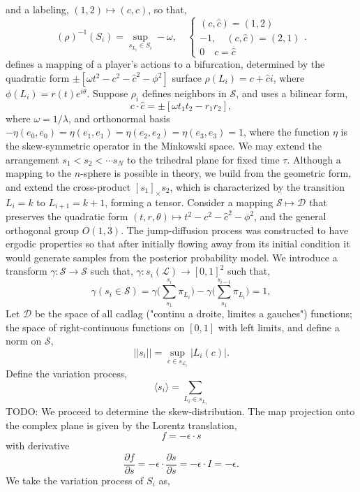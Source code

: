 \documentclass[10pt]{article}
\newcommand{\mcL}{\mathcal{L}}
\newcommand{\mcS}{\mathcal{S}}
\newcommand{\mcD}{\mathcal{D}}
\theoremstyle{definition}
\begin{document}
and a labeling, $(1,2)\mapsto (c,\hat c)$, so that,
$$
    (\rho)^{-1}(S_i) = \sup_{s_{L_i} \in S_i} -\omega, \quad \begin{cases}
    (c,\hat c)
    = (1,2)\\ -1, \quad (c,\hat c) = (2,1) \\ 0 \quad c=\hat c\end{cases}.
$$
defines a mapping of a player's actions to a bifurcation, determined by the 
quadratic form $\pm [\omega t^2 - c^2 -\hat c^2 - \phi^2]$ 
surface $\rho(L_i) = c + \hat ci$, where $\phi(L_i) = r(t)e^{i\theta}$.
Suppose $\rho_i$ defines neighbors in $\mcS$, and uses a bilinear form,
$$  
   c\cdot \hat c = \pm [\omega t_1t_2 - r_1r_2],
$$
where $\omega = 1/\lambda$, and orthonormal basis $-\eta(e_0,e_0) = \eta(e_1,e_1) = \eta(e_2,e_2) =
\eta(e_3,e_3) = 1$, where the function $\eta$ is the skew-symmetric operator in
the Minkowski space.
We may extend the arrangement $s_1<s_2<\cdots s_N$ to the trihedral plane for
fixed time $\tau$. Although a mapping to the $n$-sphere is possible in theory,
we build from the geometric form, and extend the cross-product $[s_1]_\times
s_2$, which is characterized by the transition $L_i=k$ to $L_{i+1}=k+1$, forming
a tensor.
Consider a mapping $\mcS\mapsto \mcD$ that preserves the quadratic form $(t, r,
\theta)\mapsto t^2-c^2-\hat c^2-\phi^2$, and the general orthogonal group $O(1,3)$.
The jump-diffusion process was constructed to have ergodic properties so that after initially flowing away from its initial condition it would generate samples from the posterior probability model.
We introduce a transform $\gamma: \mcS \rightarrow \mcS$ such that,
$\gamma: s_i(\mcL) \rightarrow [0,1]^2$ such that,
$$
    \gamma(s_i \in \mcS) = \gamma\bigg(\displaystyle\sum_{s_1}^{s_i} \pi_{L_i} \bigg)-
    \gamma\bigg(\displaystyle\sum_{s_1}^{s_{i-1}}\pi_{L_i}\bigg) = 1,
$$
Let $\mcD$ be the space of all cadlag ("continu a droite, limites a
gauches") functions; the space of right-continuous functions on $[0,1]$ with left
limits, and define a norm on $\mcS$, 
$$
    \vert\vert s_i \vert\vert = \sup_{c \in s_{\mcL_i}} \vert L_i(c)\vert.
$$
Define the variation process,
$$
    \langle s_i\rangle = \displaystyle\sum_{L_i \in s_{L_i}}
$$
TODO: %
We proceed to determine the skew-distribution.
The map projection onto the complex plane is given by the Lorentz
translation,
$$
    f = -\epsilon \cdot s
$$
with derivative 
$$
    \frac{\partial f}{\partial s} = -\epsilon \cdot \frac{\partial s}{\partial
    s} = -\epsilon\cdot I = -\epsilon.
$$
We take the variation process of $S_i$ as, 
\end{document}

